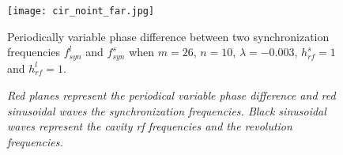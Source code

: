 \begin{figure}[!htb]
   \centering   
   \texttt{[image: cir\_noint\_far.jpg]}
   \caption{Periodically variable phase difference between two synchronization frequencies $f_{\mathit{syn}}^{l}$ and $f_{\mathit{syn}}^{s}$ when $m=26$, $n=10$, $\lambda=-0.003$, $h^s_\mathit{rf}=1$ and $h^l_\mathit{rf}=1$.}
	\caption*{\textsl{\small{Red planes represent the periodical variable phase difference and red sinusoidal waves the synchronization frequencies. Black sinusoidal waves represent the cavity rf frequencies and the revolution frequencies.}}}
   \label{cir_noint_far}
\end{figure} 





%

  
